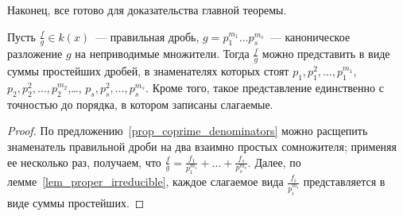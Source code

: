 Наконец, все готово для доказательства главной теоремы.
\begin{theorem}\label{thm_sum_of_simplest}
Пусть $\frac{f}{g}\in k(x)$~--- правильная дробь, $g=p_1^{m_1}\dots
p_s^{m_s}$~--- каноническое разложение $g$ на неприводимые
множители. Тогда $\frac{f}{g}$ можно представить в виде суммы
простейших дробей, в знаменателях которых стоят
$p_1,p_1^2,\dots,p_1^{m_1}$, $p_2,p_2^2,\dots,p_2^{m_2}$,\dots,
$p_s,p_s^2,\dots,p_s^{m_s}$. Кроме того, такое представление
единственно с точностью до порядка, в котором записаны слагаемые.
\end{theorem}
\begin{proof}
По предложению~\ref{prop_coprime_denominators} можно расщепить
знаменатель правильной дроби на два взаимно простых сомножителя;
применяя ее несколько раз, получаем, что
$\frac{f}{g}=\frac{f_1}{p_1^{m_1}}+\dots+\frac{f_s}{p_s^{m_s}}$. Далее,
по лемме~\ref{lem_proper_irreducible}, каждое слагаемое вида
$\frac{f_i}{p_i^{m_i}}$ представляется в виде суммы простейших.


\end{proof}
